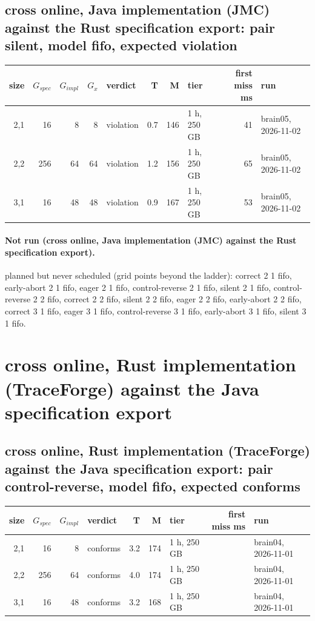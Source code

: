 \documentclass[10pt]{article}
\begin{document}
\subsection*{cross online, Java implementation (JMC) against the Rust specification export: pair \textsf{silent}, model fifo, expected violation}
\begin{longtable}{@{}rrrrlrrlrl@{}}
\toprule
size & $G_{\mathit{spec}}$ & $G_{\mathit{impl}}$ & $G_x$ & verdict & T & M & tier & first miss ms & run \\
\midrule
\endhead
\color{red} 2,1 & 16 & 8 & 8 & violation & 0.7 & 146 & 1 h, 250 GB & 41 & brain05, 2026-11-02 \\
\color{red} 2,2 & 256 & 64 & 64 & violation & 1.2 & 156 & 1 h, 250 GB & 65 & brain05, 2026-11-02 \\
\color{red} 3,1 & 16 & 48 & 48 & violation & 0.9 & 167 & 1 h, 250 GB & 53 & brain05, 2026-11-02 \\
\bottomrule
\end{longtable}
\paragraph{Not run (cross online, Java implementation (JMC) against the Rust specification export).}
planned but never scheduled (grid points beyond the ladder): correct 2 1 fifo, early-abort 2 1 fifo, eager 2 1 fifo, control-reverse 2 1 fifo, silent 2 1 fifo, control-reverse 2 2 fifo, correct 2 2 fifo, silent 2 2 fifo, eager 2 2 fifo, early-abort 2 2 fifo, correct 3 1 fifo, eager 3 1 fifo, control-reverse 3 1 fifo, early-abort 3 1 fifo, silent 3 1 fifo.\par
\section*{cross online, Rust implementation (TraceForge) against the Java specification export}
\subsection*{cross online, Rust implementation (TraceForge) against the Java specification export: pair \textsf{control-reverse}, model fifo, expected conforms}
\begin{longtable}{@{}rrrlrrlrl@{}}
\toprule
size & $G_{\mathit{spec}}$ & $G_{\mathit{impl}}$ & verdict & T & M & tier & first miss ms & run \\
\midrule
\endhead
\color{red} 2,1 & 16 & 8 & conforms & 3.2 & 174 & 1 h, 250 GB &  & brain04, 2026-11-01 \\
\color{red} 2,2 & 256 & 64 & conforms & 4.0 & 174 & 1 h, 250 GB &  & brain04, 2026-11-01 \\
\color{red} 3,1 & 16 & 48 & conforms & 3.2 & 168 & 1 h, 250 GB &  & brain04, 2026-11-01 \\
\bottomrule
\end{longtable}
\end{document}
